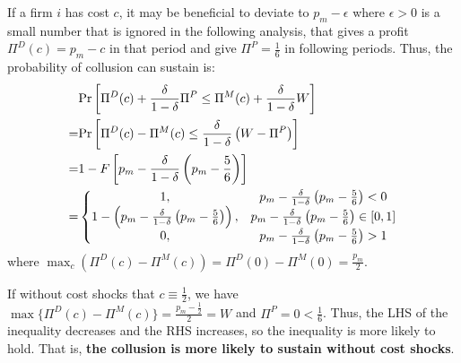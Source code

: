 \documentclass[12pt]{article}
\begin{document}
If a firm $i$ has cost $c$, it may be beneficial to deviate to $p_m-\epsilon$ where $\epsilon>0$ is a small number that is ignored in the following analysis, that gives a profit $\Pi^D(c)=p_m-c$ in that period and give $\Pi^P=\frac{1}{6}$ in following periods. Thus, the probability of collusion can sustain is:
\begin{equation}
    \begin{aligned}
        &\textnormal{Pr}\left[\Pi^D(c)+\frac{\delta}{1-\delta}\Pi^P\leq \Pi^M(c)+\frac{\delta}{1-\delta}W\right]\\
        =&\textnormal{Pr}\left[\Pi^D(c)-\Pi^M(c)\leq \frac{\delta}{1-\delta}\left(W-\Pi^P\right)\right]\\
        =&1-F\left[p_m-\frac{\delta}{1-\delta}\left(p_m-\frac{5}{6}\right)\right]\\
        =&\left\{\begin{matrix}
            1,&p_m-\frac{\delta}{1-\delta}\left(p_m-\frac{5}{6}\right)<0\\
            1-\left(p_m-\frac{\delta}{1-\delta}\left(p_m-\frac{5}{6}\right)\right),&p_m-\frac{\delta}{1-\delta}\left(p_m-\frac{5}{6}\right)\in[0,1]\\
            0,&p_m-\frac{\delta}{1-\delta}\left(p_m-\frac{5}{6}\right)>1
        \end{matrix}\right.
        \end{aligned}
        \label{eq_p}
\end{equation}
where $\max_c\left(\Pi^D(c)-\Pi^M(c)\right)=\Pi^D(0)-\Pi^M(0)=\frac{p_m}{2}$.

If without cost shocks that $c\equiv \frac{1}{2}$, we have $\max\{\Pi^D(c)-\Pi^M(c)\}=\frac{p_m-\frac{1}{2}}{2}=W$ and $\Pi^P=0<\frac{1}{6}$. Thus, the LHS of the inequality decreases and the RHS increases, so the inequality is more likely to hold. That is, \textbf{the collusion is more likely to sustain without cost shocks}.
\end{document}
